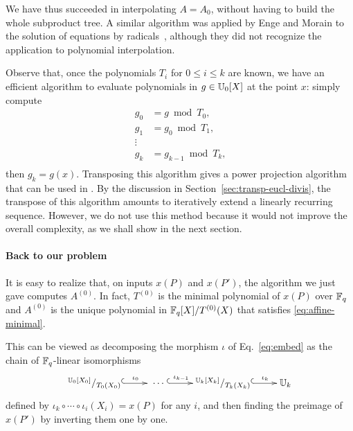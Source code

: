  We have thus succeeded in interpolating $A=A_0$,
without having to build the whole subproduct tree. A similar algorithm
was applied by Enge and Morain to the solution of equations by
radicals~\cite{enge+morain03}, although they did not recognize the
application to polynomial interpolation.

\begin{remark}
  Observe that, once the polynomials $T_i$ for $0\le i\le k$ are
  known, we have an efficient algorithm to evaluate polynomials in
  $g\in\mathbb{U}_0[X]$ at the point $x$: simply compute
  \begin{equation}
    \label{eq:191}
    \begin{aligned}
      g_0 &= g\bmod T_0\text{,}\\
      g_1 &= g_0\bmod T_1\text{,}\\
      \vdots\\
      g_k &= g_{k-1}\bmod T_k\text{,}\\
    \end{aligned}
  \end{equation}
  then $g_k=g(x)$. Transposing this algorithm gives a power projection
  algorithm that can be used in . By the discussion in
  Section~\ref{sec:transp-eucl-divis}, the
  transpose of this algorithm
  amounts to iteratively extend a linearly recurring
  sequence. However, we do not use this method because it would not
  improve the overall complexity, as we shall show in the next
  section.
\end{remark}


\paragraph{Back to our problem}
It is easy to realize that, on inputs $x(P)$ and $x(P')$, the
algorithm we just gave computes $A^{(0)}$. In fact, $T^{(0)}$ is
the minimal polynomial of $x(P)$ over $\mathbb{F}_q$ and $A^{(0)}$ is the
unique polynomial in $\mathbb{F}_q[X]/T^{(0)}(X)$ that satisfies
\eqref{eq:affine-minimal}.

This can be viewed as decomposing the morphism $\iota$ of
Eq.~\eqref{eq:embed} as the chain of $\mathbb{F}_q$-linear isomorphisms
\begin{equation}
  \xymatrix{
    ^{\U_0[X_0]}/_{T_0(X_0)} \ar@{^{(}->}[r]^-{\iota_0} &
    \;\cdots\; \ar@{^{(}->}[r]^-{\iota_{k-1}} &
    ^{\U_k[X_k]}/_{T_k(X_k)} \ar@{^{(}->}[r]^-{\iota_k} &
    \U_k
  }
\end{equation}
defined by $\iota_k\circ\cdots\circ\iota_i(X_i) = x(P)$ for any $i$,
and then finding the preimage of $x(P')$ by inverting them one by
one.

